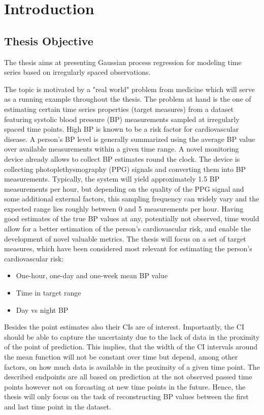 \chapter{Introduction}\label{ch:introduction}


\section{Thesis Objective}\label{sec:thesis-objective}

The thesis aims at presenting Gaussian process regression for modeling time
series based on irregularly spaced observations.

The topic is motivated by a "real world" problem from medicine which will
serve as a running example throughout the thesis.
%
The problem at hand is the one of estimating certain time series properties (target measures) from a dataset
featuring systolic blood pressure (BP) measurements sampled at irregularly spaced time points.
High BP is known to be a risk factor for cardiovascular disease.
A person’s BP level is generally summarized using the average BP value over available measurements within a given time range.
A novel monitoring device already allows to collect BP estimates round the clock.
The device is collecting photoplethysmography (PPG) signals and converting them into BP measurements.
Typically, the system will yield approximately 1.5 BP measurements per hour, but depending on the quality of the PPG signal and some additional external factors,
this sampling frequency can widely vary and the expected range lies roughly between 0 and 5 measurements per hour.
Having good estimates of the true BP values at any, potentially not observed, time would allow for a better estimation
of the person’s cardiovascular risk, and enable the development of novel valuable metrics.
The thesis will focus on a set of target measures,
which have been considered most relevant for estimating the person’s cardiovascular risk:
\begin{itemize}
    \item One-hour, one-day and one-week mean BP value
    \item Time in target range
    \item Day vs night BP
\end{itemize}
Besides the point estimates also their CIs are of interest.
Importantly, the CI should be able to capture the uncertainty due to the lack of data in the proximity of the point of prediction.
This implies, that the width of the CI intervals around the mean function will not be constant over time but depend, among
other factors, on how much data is available in the proximity of a given time point.
The described endpoints are all based on prediction at the not observed passed time points however not on forcasting at new time points in
the future.
Hence, the thesis will only focus on the task of reconstructing BP values between the first and last time point in the dataset.

